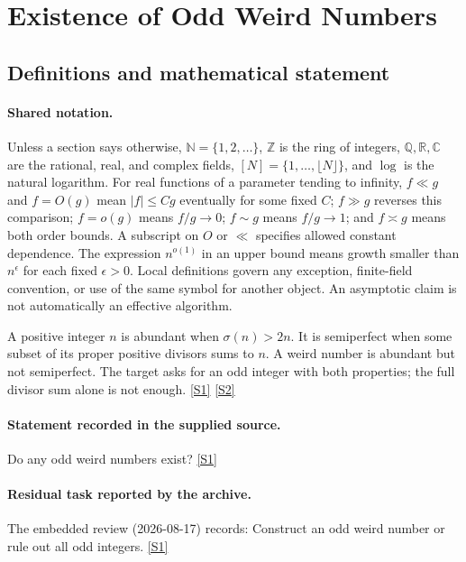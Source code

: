 \documentclass[11pt,a4paper]{article}
\newcommand{\N}{\mathbb{N}}
\newcommand{\Z}{\mathbb{Z}}
\newcommand{\Q}{\mathbb{Q}}
\newcommand{\R}{\mathbb{R}}
\newcommand{\C}{\mathbb{C}}
\newcommand{\sref}[2]{\hyperlink{source:#1:#2}{[S#2]}}
\begin{document}
\section{Existence of Odd Weird Numbers}\label{statement}


\subsection{Definitions and mathematical statement}

\paragraph{Shared notation.}Unless a section says otherwise, $\N=\{1,2,\ldots\}$,
$\Z$ is the ring of integers, $\Q,\R,\C$ are the rational, real, and complex
fields, $[N]=\{1,\ldots,\lfloor N\rfloor\}$, and $\log$ is the natural
logarithm. For real functions of a parameter tending to infinity,
$f\ll g$ and $f=O(g)$ mean $|f|\leq Cg$ eventually for some fixed $C$;
$f\gg g$ reverses this comparison; $f=o(g)$ means $f/g\to0$;
$f\sim g$ means $f/g\to1$; and $f\asymp g$ means both order bounds.
A subscript on $O$ or $\ll$ specifies allowed constant dependence.
The expression $n^{o(1)}$ in an upper bound means growth smaller than
$n^\epsilon$ for each fixed $\epsilon>0$. Local definitions govern any
exception, finite-field convention, or use of the same symbol for another
object. An asymptotic claim is not automatically an effective algorithm.



A positive integer $n$ is abundant when $\sigma(n)>2n$. It is semiperfect when some subset of its proper positive divisors sums to $n$. A weird number is abundant but not semiperfect. The target asks for an odd integer with both properties; the full divisor sum alone is not enough. \sref{statement}{1} \sref{statement}{2}

\paragraph{Statement recorded in the supplied source.}
Do any odd weird numbers exist? \sref{statement}{1}

\paragraph{Residual task reported by the archive.}

The embedded review (2026-08-17) records: Construct an odd weird number or rule out all odd integers. \sref{statement}{1}
\end{document}
